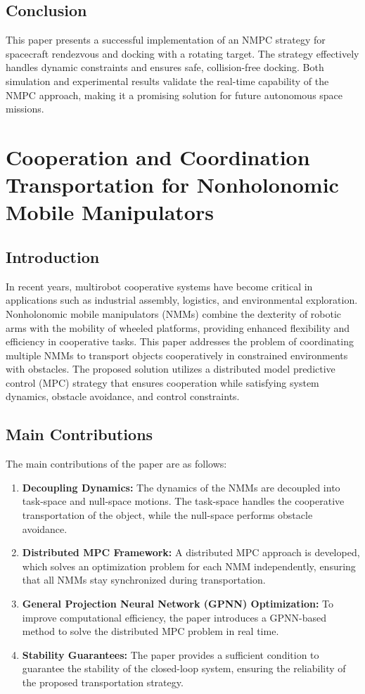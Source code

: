 \documentclass[a4paper,12pt]{article}
\begin{document}
\subsection{Conclusion}
This paper presents a successful implementation of an NMPC strategy for spacecraft rendezvous and docking with a rotating target. The strategy effectively handles dynamic constraints and ensures safe, collision-free docking. Both simulation and experimental results validate the real-time capability of the NMPC approach, making it a promising solution for future autonomous space missions.

\section{Cooperation and Coordination Transportation for Nonholonomic Mobile Manipulators}

\subsection{Introduction}
In recent years, multirobot cooperative systems have become critical in applications such as industrial assembly, logistics, and environmental exploration. Nonholonomic mobile manipulators (NMMs) combine the dexterity of robotic arms with the mobility of wheeled platforms, providing enhanced flexibility and efficiency in cooperative tasks. This paper addresses the problem of coordinating multiple NMMs to transport objects cooperatively in constrained environments with obstacles. The proposed solution utilizes a distributed model predictive control (MPC) strategy that ensures cooperation while satisfying system dynamics, obstacle avoidance, and control constraints.

\subsection{Main Contributions}
The main contributions of the paper are as follows:
\begin{enumerate}
	\item \textbf{Decoupling Dynamics:} The dynamics of the NMMs are decoupled into task-space and null-space motions. The task-space handles the cooperative transportation of the object, while the null-space performs obstacle avoidance.
	\item \textbf{Distributed MPC Framework:} A distributed MPC approach is developed, which solves an optimization problem for each NMM independently, ensuring that all NMMs stay synchronized during transportation.
	\item \textbf{General Projection Neural Network (GPNN) Optimization:} To improve computational efficiency, the paper introduces a GPNN-based method to solve the distributed MPC problem in real time.
	\item \textbf{Stability Guarantees:} The paper provides a sufficient condition to guarantee the stability of the closed-loop system, ensuring the reliability of the proposed transportation strategy.
\end{enumerate}
\end{document}
